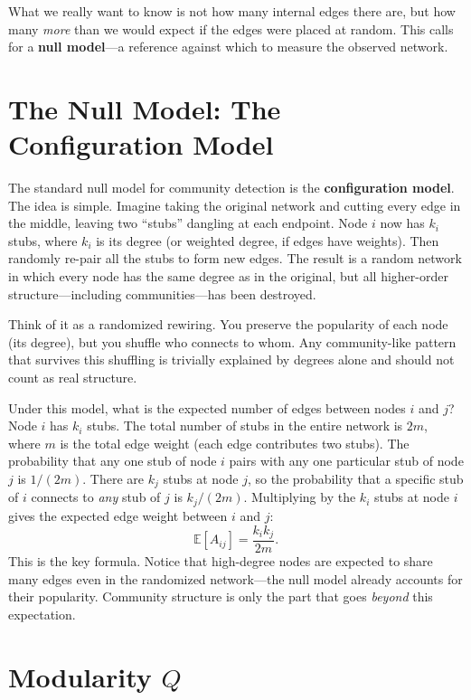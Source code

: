 \documentclass[11pt]{article}
\theoremstyle{definition}
\begin{document}
What we really want to know is not how many internal edges there are, but how many \emph{more} than we would expect if the edges were placed at random. This calls for a \textbf{null model}---a reference against which to measure the observed network.

\section{The Null Model: The Configuration Model}

The standard null model for community detection is the \textbf{configuration model}. The idea is simple. Imagine taking the original network and cutting every edge in the middle, leaving two ``stubs'' dangling at each endpoint. Node $i$ now has $k_i$ stubs, where $k_i$ is its degree (or weighted degree, if edges have weights). Then randomly re-pair all the stubs to form new edges. The result is a random network in which every node has the same degree as in the original, but all higher-order structure---including communities---has been destroyed.

\begin{intubox}
Think of it as a randomized rewiring. You preserve the popularity of each node (its degree), but you shuffle who connects to whom. Any community-like pattern that survives this shuffling is trivially explained by degrees alone and should not count as real structure.
\end{intubox}

Under this model, what is the expected number of edges between nodes $i$ and $j$? Node $i$ has $k_i$ stubs. The total number of stubs in the entire network is $2m$, where $m$ is the total edge weight (each edge contributes two stubs). The probability that any one stub of node $i$ pairs with any one particular stub of node $j$ is $1/(2m)$. There are $k_j$ stubs at node $j$, so the probability that a specific stub of $i$ connects to \emph{any} stub of $j$ is $k_j / (2m)$. Multiplying by the $k_i$ stubs at node $i$ gives the expected edge weight between $i$ and $j$:
\[
  \mathbb{E}[A_{ij}] = \frac{k_i k_j}{2m}.
\]
This is the key formula. Notice that high-degree nodes are expected to share many edges even in the randomized network---the null model already accounts for their popularity. Community structure is only the part that goes \emph{beyond} this expectation.

\section{Modularity $Q$}
\end{document}
